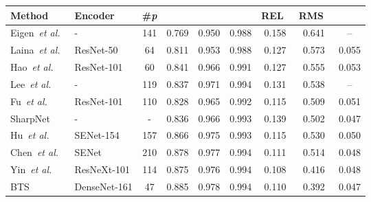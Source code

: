 \documentclass[runningheads]{llncs}
\newcommand{\etal}{\textit{et al.}}
\begin{document}
\begin{table}[t]
\centering
\begin{adjustbox}{width=\linewidth,center}
\begin{tabularx}{\linewidth}{@{}l|lS|*{5}{C}c@{}}
\toprule
\textbf{Method} & \textbf{Encoder}    & \textbf{\#\textit{p}}   & \textbf{}       & \textbf{}          & \textbf{}~            & REL~          & RMS~  & ~ \\ \midrule
Eigen~\etal~\cite{Eigen2014} & - & 141                                                      & 0.769          & 0.950          & 0.988          & 0.158            & 0.641          & --              \\ 
Laina~\etal~\cite{Laina2016} & ResNet-50  & 64                                                  & 0.811          & 0.953          & 0.988          & 0.127            & 0.573          & 0.055                \\ 
Hao~\etal~\cite{Hao2018DetailPD} & ResNet-101  & 60                                                     & 0.841          & 0.966          & 0.991          & 0.127            & 0.555          & 0.053                \\ 
Lee~\etal~\cite{Lee2011} & - & 119                                                      & 0.837          & 0.971          & 0.994          & 0.131            & 0.538          &   --                   \\
Fu~\etal~\cite{Fu2018DeepOR} & ResNet-101 & 110                                                     & 0.828          & 0.965          & 0.992          & 0.115            & 0.509          &   0.051                   \\
SharpNet~\cite{Ramamonjisoa_2019_ICCV} & - & -                                                            & 0.836          & 0.966          & 0.993          & 0.139            & 0.502          &      {0.047}          \\
Hu~\etal~\cite{Hu2018RevisitingSI} & SENet-154  & 157                                                              & 0.866          & 0.975          & 0.993          & 0.115            & 0.530          &    0.050            \\ 
Chen~\etal~\cite{ijcai2019-98} & SENet & 210                                                      & 0.878          & 0.977          & 0.994          & 0.111            & 0.514          &  0.048              \\ 
Yin~\etal~\cite{Yin_2019_ICCV} & ResNeXt-101  & 114                                                             & 0.875          & 0.976          & 0.994          & {0.108}            & 0.416          & 0.048               \\ 
BTS~\cite{bts_lee2019big} & DenseNet-161   & 47                                                            & {0.885}          & 0.978          & 0.994          & 0.110            & {0.392}          & {0.047}          \\ 



\end{tabularx}
\end{adjustbox}
\end{table}
\end{document}
